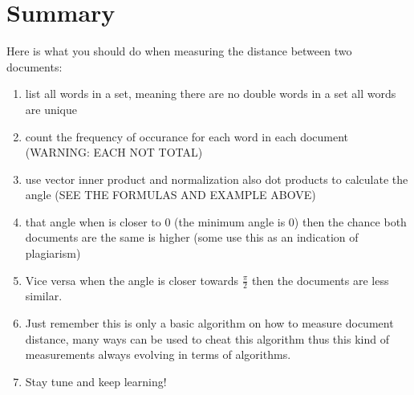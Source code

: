 \documentclass{article}
\begin{document}
    \section*{Summary}
    Here is what you should do when measuring the distance between two documents:
    \begin{enumerate}
        \item list all words in a set, meaning there are no double words in a set all words are unique
        \item count the frequency of occurance for each word in each document (WARNING: EACH NOT TOTAL)
        \item use vector inner product and normalization also dot products to calculate the angle (SEE THE FORMULAS AND EXAMPLE ABOVE)
        \item that angle when is closer to 0 (the minimum angle is 0) then the chance both documents are the same is higher (some use this as an indication of plagiarism)
        \item Vice versa when the angle is closer towards $\frac{\pi}{2}$ then the documents are less similar.
        \item Just remember this is only a basic algorithm on how to measure document distance, many ways can be used to cheat this algorithm thus this kind of measurements always evolving in terms of algorithms. 
        \item Stay tune and keep learning!
    \end{enumerate}
\end{document}
